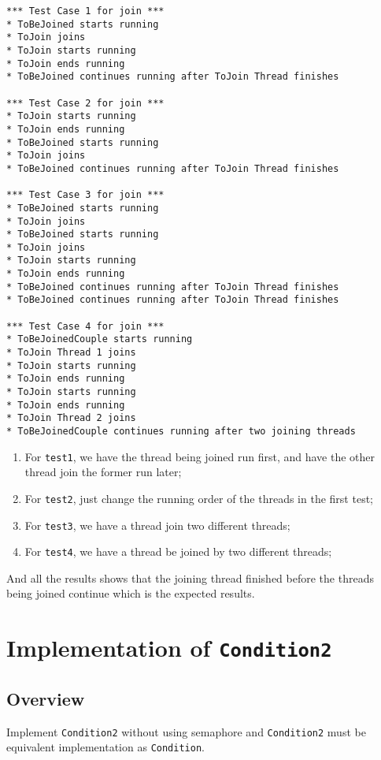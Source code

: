 \documentclass{article}
\begin{document}
\begin{lstlisting}
*** Test Case 1 for join ***
* ToBeJoined starts running
* ToJoin joins
* ToJoin starts running
* ToJoin ends running
* ToBeJoined continues running after ToJoin Thread finishes

*** Test Case 2 for join ***
* ToJoin starts running
* ToJoin ends running
* ToBeJoined starts running
* ToJoin joins
* ToBeJoined continues running after ToJoin Thread finishes

*** Test Case 3 for join ***
* ToBeJoined starts running
* ToJoin joins
* ToBeJoined starts running
* ToJoin joins
* ToJoin starts running
* ToJoin ends running
* ToBeJoined continues running after ToJoin Thread finishes
* ToBeJoined continues running after ToJoin Thread finishes

*** Test Case 4 for join ***
* ToBeJoinedCouple starts running
* ToJoin Thread 1 joins
* ToJoin starts running
* ToJoin ends running
* ToJoin starts running
* ToJoin ends running
* ToJoin Thread 2 joins
* ToBeJoinedCouple continues running after two joining threads
\end{lstlisting}

\begin{enumerate}
\item For \texttt{test1}, we have the thread being joined run first, and have the other thread join the former run later;
\item For \texttt{test2}, just change the running order of the threads in the first test;
\item For \texttt{test3}, we have a thread join two different threads;
\item For \texttt{test4}, we have a thread be joined by two different threads;
\end{enumerate}

And all the results shows that the joining thread finished before the threads being joined continue which is the expected results.
\section{Implementation of \texttt{Condition2}}
\subsection{Overview}
Implement \texttt{Condition2} without using semaphore and \texttt{Condition2} must be equivalent implementation as \texttt{Condition}.
\end{document}
